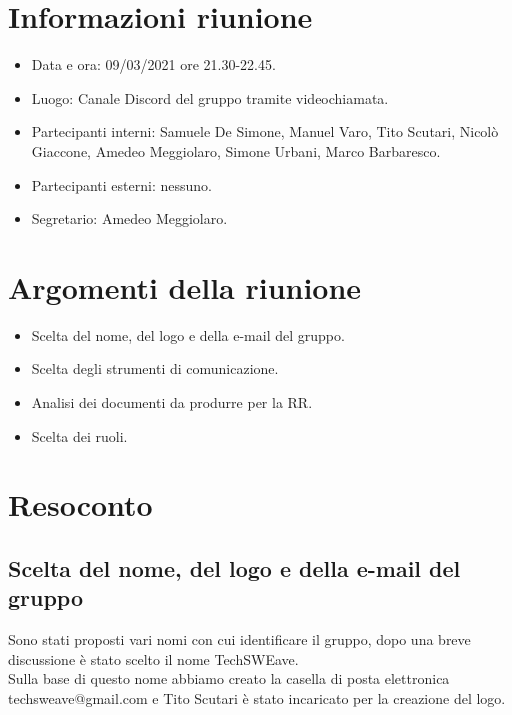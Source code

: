 \documentclass{article}
\begin{document}
    \section{Informazioni riunione}
    \begin{itemize}
        \item Data e ora: 09/03/2021 ore 21.30-22.45.
        \item Luogo: Canale Discord del gruppo tramite videochiamata.
        \item Partecipanti interni: Samuele De Simone, Manuel Varo, Tito Scutari, Nicolò Giaccone, Amedeo Meggiolaro, Simone Urbani, Marco Barbaresco.
        \item Partecipanti esterni: nessuno.
        \item Segretario: Amedeo Meggiolaro.
    \end{itemize}
    \section{Argomenti della riunione}
    \begin{itemize}
        \item Scelta del nome, del logo e della e-mail del gruppo.
        \item Scelta degli strumenti di comunicazione.
        \item Analisi dei documenti da produrre per la RR.
        \item Scelta dei ruoli.
    \end{itemize}
    \section{Resoconto}
    
        \subsection{Scelta del nome, del logo e della e-mail del gruppo}
        Sono stati proposti vari nomi con cui identificare il gruppo, dopo una breve
        discussione è stato scelto il nome TechSWEave.\\
        Sulla base di questo nome abbiamo creato la casella di posta elettronica 
        techsweave@gmail.com e Tito Scutari è stato incaricato per la creazione del logo.
        
\end{document}
